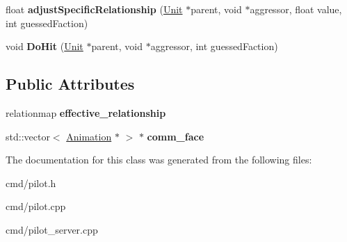 \begin{DoxyCompactItemize}
\item 
float {\bfseries adjust\+Specific\+Relationship} (\hyperlink{classUnit}{Unit} $\ast$parent, void $\ast$aggressor, float value, int guessed\+Faction)\hypertarget{classPilot_add3f59406ba6cd3e356110dfbb3279ee}{}\label{classPilot_add3f59406ba6cd3e356110dfbb3279ee}

\item 
void {\bfseries Do\+Hit} (\hyperlink{classUnit}{Unit} $\ast$parent, void $\ast$aggressor, int guessed\+Faction)\hypertarget{classPilot_a03acc29a0923a94e64c8730f76f879f0}{}\label{classPilot_a03acc29a0923a94e64c8730f76f879f0}

\end{DoxyCompactItemize}
\subsection*{Public Attributes}
\begin{DoxyCompactItemize}
\item 
relationmap {\bfseries effective\+\_\+relationship}\hypertarget{classPilot_a4325cbe1a7c968863f3a19fd1359f2e3}{}\label{classPilot_a4325cbe1a7c968863f3a19fd1359f2e3}

\item 
std\+::vector$<$ \hyperlink{classAnimation}{Animation} $\ast$ $>$ $\ast$ {\bfseries comm\+\_\+face}\hypertarget{classPilot_a168ed278987804200c66bbb04ac1873b}{}\label{classPilot_a168ed278987804200c66bbb04ac1873b}

\end{DoxyCompactItemize}


The documentation for this class was generated from the following files\+:\begin{DoxyCompactItemize}
\item 
cmd/pilot.\+h\item 
cmd/pilot.\+cpp\item 
cmd/pilot\+\_\+server.\+cpp\end{DoxyCompactItemize}

